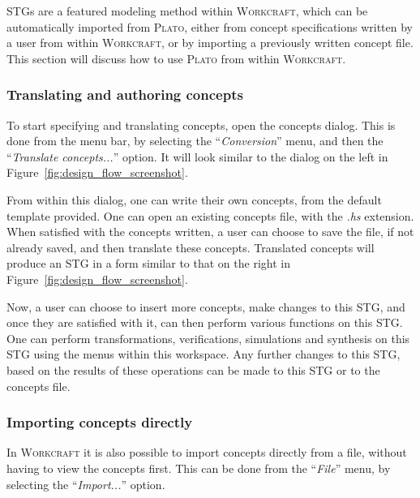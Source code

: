\documentclass[british, 10pt, conference, compsocconf]{IEEEtran}
\newcommand{\noun}[1]{\textsc{#1}}
\begin{document}
STGs are a featured modeling method within \noun{Workcraft},
which can be automatically imported from \noun{Plato}, either from concept specifications written by a user from within 
\noun{Workcraft}, or by importing a previously written concept file. 
This section will discuss how to use \noun{Plato} from within
\noun{Workcraft}.

 
\subsubsection{Translating and authoring concepts}

To start specifying and translating concepts, open the concepts dialog.  This is
done from the menu bar, by selecting the ``\emph{Conversion}'' menu, and then
the ``\emph{Translate concepts...}'' option. It will look similar to the dialog 
on the left in Figure~\ref{fig:design_flow_screenshot}.

From within this dialog, one can write their own concepts, from the default 
template provided. One can open an 
existing concepts file, with the \emph{.hs} extension. When satisfied with the 
concepts written, a user can choose to save the file, if not already saved, and
then translate these concepts. Translated concepts will produce an STG in a 
form similar to that on the right in Figure~\ref{fig:design_flow_screenshot}.

Now, a user can choose to insert more 
concepts, make changes to this STG, and once they are satisfied with it, can 
then perform various functions on this STG. One can perform transformations, 
verifications, simulations and synthesis on this STG using the menus within this 
workspace. Any further changes to this STG, based on the results of these 
operations can be made to this STG or to the concepts file. 

\subsubsection{Importing concepts directly}


In \noun{Workcraft} it is also possible to import concepts directly from a file,
without having to view the concepts first. This can be done from the 
``\emph{File}'' menu, by selecting the ``\emph{Import...}'' option. 
\end{document}
